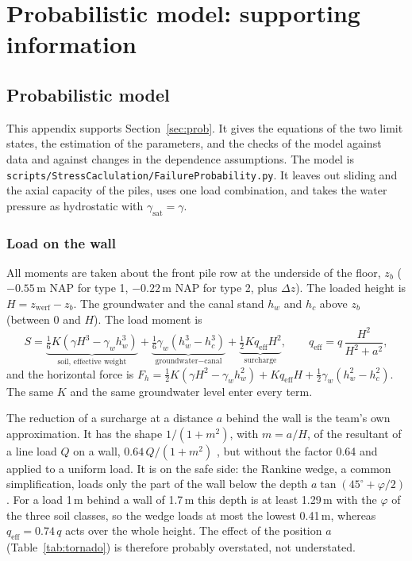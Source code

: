 \chapter{Probabilistic model: supporting information}
\label{app:pm}


\section{Probabilistic model}\label{app:prob}

This appendix supports Section~\ref{sec:prob}. It gives the equations of the
two limit states, the estimation of the parameters, and the checks of the
model against data and against changes in the dependence assumptions. The
model is \texttt{scripts/StressCaclulation/FailureProbability.py}. It leaves
out sliding and the axial capacity of the piles, uses one load combination,
and takes the water pressure as hydrostatic with
$\gamma_\text{sat} = \gamma$.

\subsection{Load on the wall}\label{app:prob-load}

All moments are taken about the front pile row at the underside of the floor,
$z_b$ ($-0.55$\,m NAP for type 1, $-0.22$\,m NAP for type 2, plus $\Delta z$).
The loaded height is $H = z_\text{werf} - z_b$. The groundwater and the canal
stand $h_w$ and $h_c$ above $z_b$ (between 0 and $H$). The load moment is
\begin{equation}
S = \underbrace{\tfrac{1}{6}K\left(\gamma H^3 - \gamma_w h_w^3\right)}_{\text{soil, effective weight}}
  + \underbrace{\tfrac{1}{6}\gamma_w\left(h_w^3 - h_c^3\right)}_{\text{groundwater} - \text{canal}}
  + \underbrace{\tfrac{1}{2}K q_\text{eff} H^2}_{\text{surcharge}},
\qquad q_\text{eff} = q\,\frac{H^2}{H^2 + a^2},
\label{eq:app-load}
\end{equation}
and the horizontal force is
$F_h = \tfrac12 K(\gamma H^2 - \gamma_w h_w^2) + K q_\text{eff} H
+ \tfrac12\gamma_w(h_w^2 - h_c^2)$. The same $K$ and the same groundwater
level enter every term.

The reduction of a surcharge at a distance $a$ behind the wall is the team's
own approximation. It has the shape $1/(1+m^2)$, with $m = a/H$, of the
resultant of a line load $Q$ on a wall, $0.64\,Q/(1+m^2)$
\parencite{terzaghi1954,navfac1986}, but without the factor 0.64 and applied to
a uniform load. It is on the safe side: the Rankine wedge, a common
simplification, loads only the part of the wall below the depth
$a \tan(45^\circ + \varphi/2)$. For a load 1\,m behind a wall of 1.7\,m this
depth is at least 1.29\,m with the $\varphi$ of the three soil classes, so the
wedge loads at most the lowest 0.41\,m, whereas $q_\text{eff} = 0.74\,q$ acts
over the whole height. The effect of the position $a$
(Table~\ref{tab:tornado}) is therefore probably overstated, not understated.

